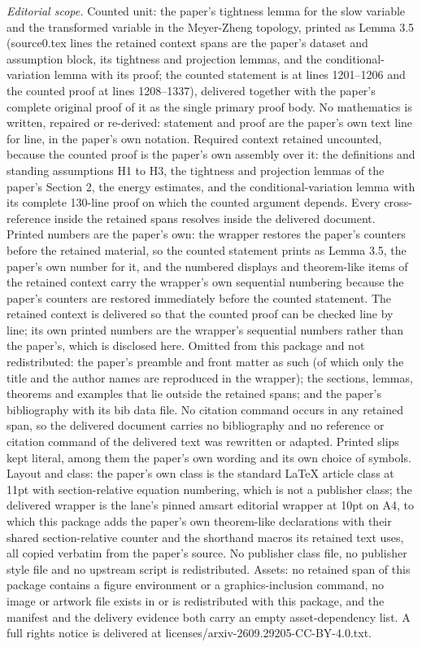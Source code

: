 \documentclass[10pt,a4paper]{amsart}
\theoremstyle{plain}
\numberwithin{equation}{section}
\begin{document}
\noindent\textit{Editorial scope.} Counted unit: the paper's tightness lemma for the slow variable and the transformed variable in the Meyer-Zheng topology, printed as Lemma 3.5 (source0.tex lines the retained context spans are the paper's dataset and assumption block, its tightness and projection lemmas, and the conditional-variation lemma with its proof; the counted statement is at lines 1201--1206 and the counted proof at lines 1208--1337), delivered together with the paper's complete original proof of it as the single primary proof body. No mathematics is written, repaired or re-derived: statement and proof are the paper's own text line for line, in the paper's own notation. Required context retained uncounted, because the counted proof is the paper's own assembly over it: the definitions and standing assumptions H1 to H3, the tightness and projection lemmas of the paper's Section 2, the energy estimates, and the conditional-variation lemma with its complete 130-line proof on which the counted argument depends. Every cross-reference inside the retained spans resolves inside the delivered document. Printed numbers are the paper's own: the wrapper restores the paper's counters before the retained material, so the counted statement prints as Lemma 3.5, the paper's own number for it, and the numbered displays and theorem-like items of the retained context carry the wrapper's own sequential numbering because the paper's counters are restored immediately before the counted statement. The retained context is delivered so that the counted proof can be checked line by line; its own printed numbers are the wrapper's sequential numbers rather than the paper's, which is disclosed here. Omitted from this package and not redistributed: the paper's preamble and front matter as such (of which only the title and the author names are reproduced in the wrapper); the sections, lemmas, theorems and examples that lie outside the retained spans; and the paper's bibliography with its bib data file. No citation command occurs in any retained span, so the delivered document carries no bibliography and no reference or citation command of the delivered text was rewritten or adapted. Printed slips kept literal, among them the paper's own wording and its own choice of symbols. Layout and class: the paper's own class is the standard LaTeX article class at 11pt with section-relative equation numbering, which is not a publisher class; the delivered wrapper is the lane's pinned amsart editorial wrapper at 10pt on A4, to which this package adds the paper's own theorem-like declarations with their shared section-relative counter and the shorthand macros its retained text uses, all copied verbatim from the paper's source. No publisher class file, no publisher style file and no upstream script is redistributed. Assets: no retained span of this package contains a figure environment or a graphics-inclusion command, no image or artwork file exists in or is redistributed with this package, and the manifest and the delivery evidence both carry an empty asset-dependency list. A full rights notice is delivered at licenses/arxiv-2609.29205-CC-BY-4.0.txt.
\end{document}
